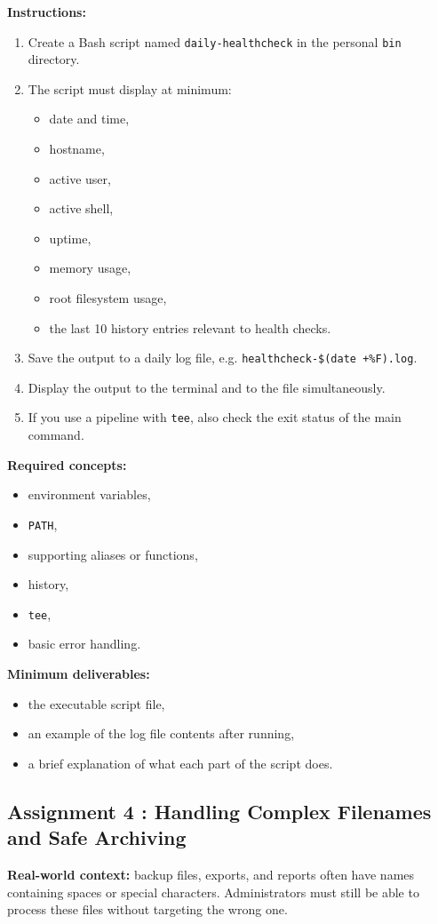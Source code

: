 \textbf{Instructions:}
\begin{enumerate}
  \item Create a Bash script named \texttt{daily-healthcheck} in the personal
    \texttt{bin} directory.
  \item The script must display at minimum:
  \begin{itemize}
    \item date and time,
    \item hostname,
    \item active user,
    \item active shell,
    \item uptime,
    \item memory usage,
    \item root filesystem usage,
    \item the last 10 history entries relevant to health checks.
  \end{itemize}
  \item Save the output to a daily log file, e.g.
    \texttt{healthcheck-\$(date +\%F).log}.
  \item Display the output to the terminal and to the file simultaneously.
  \item If you use a pipeline with \texttt{tee}, also check the exit status
    of the main command.
\end{enumerate}

\textbf{Required concepts:}
\begin{itemize}
  \item environment variables,
  \item \texttt{PATH},
  \item supporting aliases or functions,
  \item history,
  \item \texttt{tee},
  \item basic error handling.
\end{itemize}

\textbf{Minimum deliverables:}
\begin{itemize}
  \item the executable script file,
  \item an example of the log file contents after running,
  \item a brief explanation of what each part of the script does.
\end{itemize}

\subsection*{Assignment 4 : Handling Complex Filenames and Safe Archiving}
\textbf{Real-world context:} backup files, exports, and reports often have
names containing spaces or special characters. Administrators must still be
able to process these files without targeting the wrong one.

